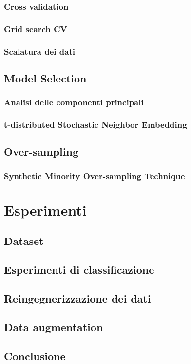 \documentclass[12pt, twoside, letterpaper]{report}
\begin{document}
			\subsection{Cross validation}
			\subsection{Grid search CV}
			\subsection{Scalatura dei dati}
		\section{Model Selection}			
			\subsection{Analisi delle componenti principali}
			\subsection{t-distributed Stochastic Neighbor Embedding}
		\section{Over-sampling}
			\subsection{Synthetic Minority Over-sampling Technique}
		
	\chapter{Esperimenti}
		\section{Dataset}
		\section{Esperimenti di classificazione}
		\section{Reingegnerizzazione dei dati}
		\section{Data augmentation}

	\section*{Conclusione}	
	
\end{document}
